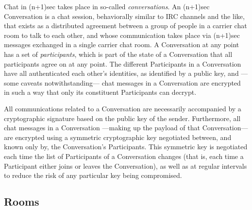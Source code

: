 \documentclass{article}
\begin{document}
Chat in (n+1)sec takes place in so-called \emph{conversations}.
An (n+1)sec Conversation is a chat session, behaviorally similar to IRC channels and the like, that exists as a distributed agreement between a group of people in a carrier chat room to talk to each other, and whose communication takes place via (n+1)sec messages exchanged in a single carrier chat room.
A Conversation at any point has a set of \emph{participants}, which is part of the state of a Conversation that all participants agree on at any point.
The different Participants in a Conversation have all authenticated each other's identities, as identified by a public key, and ---some caveats notwithstanding--- chat messages in a Conversation are encrypted in such a way that only its constituent Participants can decrypt.

All communications related to a Conversation are necessarily accompanied by a cryptographic signature based on the public key of the sender.
Furthermore, all chat messages in a Conversation ---making up the payload of that Conversation--- are encrypted using a symmetric cryptographic key negotiated between, and known only by, the Conversation's Participants.
This symmetric key is negotiated each time the list of Participants of a Conversation changes (that is, each time a Participant either joins or leaves the Conversation), as well as at regular intervals to reduce the risk of any particular key being compromised.

\subsection{Rooms}


\end{document}
